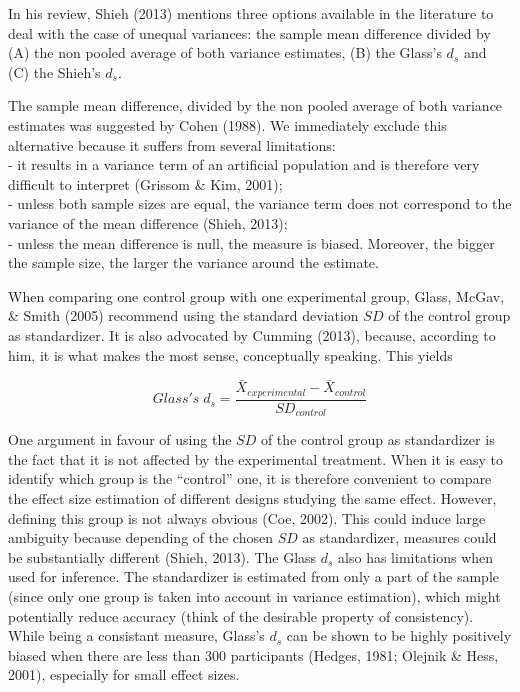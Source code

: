 \documentclass[
  man,floatsintext]{apa6}
\begin{document}
In his review, Shieh (2013) mentions three options available in the literature to deal with the case of unequal variances: the sample mean difference divided by (A) the non pooled average of both variance estimates, (B) the Glass's \(d_s\) and (C) the Shieh's \(d_s\).

The sample mean difference, divided by the non pooled average of both variance estimates was suggested by Cohen (1988). We immediately exclude this alternative because it suffers from several limitations:\\
- it results in a variance term of an artificial population and is therefore very difficult to interpret (Grissom \& Kim, 2001);\\
- unless both sample sizes are equal, the variance term does not correspond to the variance of the mean difference (Shieh, 2013);\\
- unless the mean difference is null, the measure is biased. Moreover, the bigger the sample size, the larger the variance around the estimate.

When comparing one control group with one experimental group, Glass, McGav, \& Smith (2005) recommend using the standard deviation \(SD\) of the control group as standardizer. It is also advocated by Cumming (2013), because, according to him, it is what makes the most sense, conceptually speaking. This yields

\begin{equation} 
Glass's \; d_s = \frac{\bar{X}_{experimental} - \bar{X}_{control}}{SD_{control}}
\label{eq:Glassds}
\end{equation}

One argument in favour of using the \(SD\) of the control group as standardizer is the fact that it is not affected by the experimental treatment. When it is easy to identify which group is the \enquote{control} one, it is therefore convenient to compare the effect size estimation of different designs studying the same effect. However, defining this group is not always obvious (Coe, 2002). This could induce large ambiguity because depending of the chosen \(SD\) as standardizer, measures could be substantially diﬀerent (Shieh, 2013). The Glass \(d_s\) also has limitations when used for inference. The standardizer is estimated from only a part of the sample (since only one group is taken into account in variance estimation), which might potentially reduce accuracy (think of the desirable property of consistency). While being a consistant measure, Glass's \(d_s\) can be shown to be highly positively biased when there are less than 300 participants (Hedges, 1981; Olejnik \& Hess, 2001), especially for small effect sizes.
\end{document}
